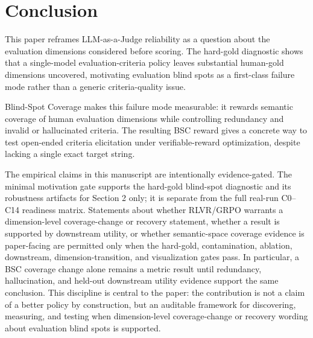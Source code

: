 \section{Conclusion}

This paper reframes LLM-as-a-Judge reliability as a question about the
evaluation dimensions considered before scoring. The hard-gold diagnostic
shows that a single-model evaluation-criteria policy leaves substantial
human-gold dimensions uncovered, motivating evaluation blind spots as a
first-class failure mode rather than a generic criteria-quality issue.

Blind-Spot Coverage makes this failure mode measurable: it rewards semantic
coverage of human evaluation dimensions while controlling redundancy and
invalid or hallucinated criteria. The resulting BSC reward gives a concrete
way to test open-ended criteria elicitation under verifiable-reward
optimization, despite lacking a single exact target string.

The empirical claims in this manuscript are intentionally evidence-gated. The
minimal motivation gate supports the hard-gold blind-spot diagnostic and its
robustness artifacts for Section 2 only; it is separate from the full real-run
C0--C14 readiness matrix. Statements about whether RLVR/GRPO warrants a
dimension-level coverage-change or recovery statement, whether a result is supported
by downstream utility, or whether semantic-space coverage evidence is
paper-facing are permitted only when the hard-gold, contamination, ablation,
downstream, dimension-transition, and visualization gates pass.
In particular, a BSC coverage change alone remains a metric result until redundancy,
hallucination, and held-out downstream utility evidence support the same
conclusion.
This discipline is central to the paper: the contribution is not a claim of a
better policy by construction, but an auditable framework for discovering,
measuring, and testing when dimension-level coverage-change or recovery wording
about evaluation blind spots is supported.
